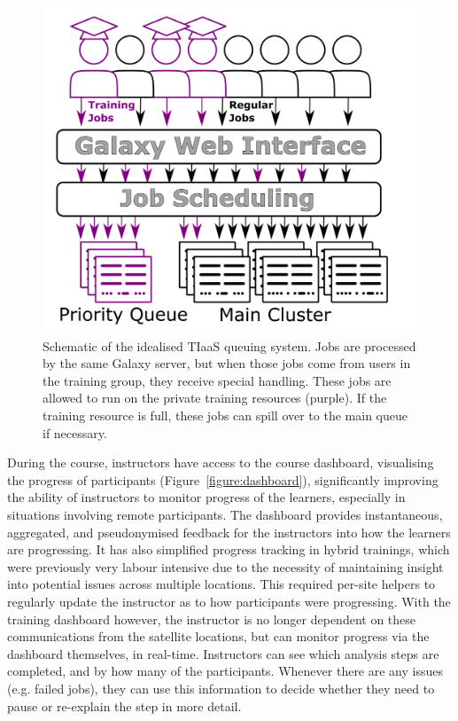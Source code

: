 \documentclass[a4paper,num-refs]{oup-contemporary}
\begin{document}
\begin{figure}[bt!]
\centering
\includegraphics[width=\linewidth]{images/rules.png}
\caption{Schematic of the idealised TIaaS queuing system. Jobs are processed by the same Galaxy server, but when those jobs come from users in the training group, they receive special handling. These jobs are allowed to run on the private training resources (purple). If the training resource is full, these jobs can spill over to the main queue if necessary.}\label{figure:queue}
\end{figure}

During the course, instructors have access to the course dashboard, visualising the progress of participants (Figure~\ref{figure:dashboard}), significantly improving the ability of instructors to monitor progress of the learners, especially in situations involving remote participants. The dashboard provides instantaneous, aggregated, and pseudonymised feedback for the instructors into how the learners are progressing. It has also simplified progress tracking in hybrid trainings, which were previously very labour intensive due to the necessity of maintaining insight into potential issues across multiple locations. This required per-site helpers to regularly update the instructor as to how participants were progressing. With the training dashboard however, the instructor is no longer dependent on these communications from the satellite locations, but can monitor progress via the dashboard themselves, in real-time. Instructors can see which analysis steps are completed, and by how many of the participants. Whenever there are any issues (e.g. failed jobs), they can use this information to decide whether they need to pause or re-explain the step in more detail.
\end{document}
